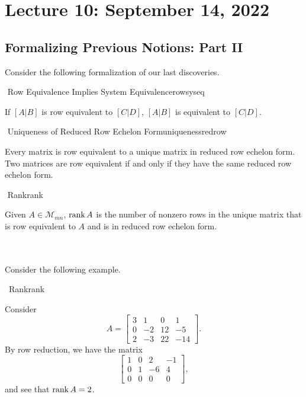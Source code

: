 \pagebreak

\section{Lecture 10: September 14, 2022}

    \subsection{Formalizing Previous Notions: Part II}
    
        Consider the following formalization of our last discoveries.
        \begin{theorem}{\Stop\,\,Row Equivalence Implies System Equivalence}{rowsyseq}
        
            If \([A|B]\) is row equivalent to \([C|D]\), \([A|B]\) is equivalent to \([C|D]\).

        \end{theorem}
        \begin{theorem}{\Stop\,\,Uniqueness of Reduced Row Echelon Form}{uniquenessredrow}
        
            Every matrix is row equivalent to a unique matrix in reduced row echelon form. Two matrices are row equivalent if and only if they have the same reduced row echelon form.
            
        \end{theorem}
        \begin{definition}{\Stop\,\,Rank}{rank}
        
            Given \(A\in\mathcal{M}_{mn}\), \(\text{rank\,}{A}\) is the number of nonzero rows in the unique matrix that is row equivalent to \(A\) and is in reduced row echelon form.
            
        \end{definition}
        \vphantom
        \\
        \\
        Consider the following example.
        \begin{example}{\Difficulty\,\Difficulty\,\,Rank}{rank}
        
            Consider
            \begin{equation*}
                A=\begin{bmatrix}
                3 & 1 & 0 & 1 \\
                0 & -2 & 12 & -5 \\
                2 & -3 & 22 & -14
                \end{bmatrix}.
            \end{equation*}
            By row reduction, we have the matrix
            \begin{equation*}
                \begin{bmatrix}
                1 & 0 & 2 & -1 \\
                0 & 1 & -6 & 4 \\
                0 & 0 & 0 & 0
                \end{bmatrix},
            \end{equation*}
            and see that \(\text{rank\,} A=2\).
        \end{example}
